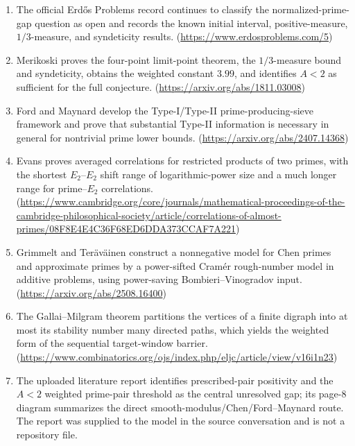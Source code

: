 \begin{enumerate}
\item The official Erdős Problems record continues to classify the normalized-prime-gap question as open and records the known initial interval, positive-measure, \(1/3\)-measure, and syndeticity results. (\url{https://www.erdosproblems.com/5})
\item Merikoski proves the four-point limit-point theorem, the \(1/3\)-measure bound and syndeticity, obtains the weighted constant \(3.99\), and identifies \(A<2\) as sufficient for the full conjecture. (\url{https://arxiv.org/abs/1811.03008})
\item Ford and Maynard develop the Type-I/Type-II prime-producing-sieve framework and prove that substantial Type-II information is necessary in general for nontrivial prime lower bounds. (\url{https://arxiv.org/abs/2407.14368})
\item Evans proves averaged correlations for restricted products of two primes, with the shortest \(E_2\)--\(E_2\) shift range of logarithmic-power size and a much longer range for prime--\(E_2\) correlations. (\url{https://www.cambridge.org/core/journals/mathematical-proceedings-of-the-cambridge-philosophical-society/article/correlations-of-almost-primes/08F8E4E4C36F68ED6DDA373CCAF7A221})
\item Grimmelt and Teräväinen construct a nonnegative model for Chen primes and approximate primes by a power-sifted Cramér rough-number model in additive problems, using power-saving Bombieri--Vinogradov input. (\url{https://arxiv.org/abs/2508.16400})
\item The Gallai--Milgram theorem partitions the vertices of a finite digraph into at most its stability number many directed paths, which yields the weighted form of the sequential target-window barrier. (\url{https://www.combinatorics.org/ojs/index.php/eljc/article/view/v16i1n23})
\item The uploaded literature report identifies prescribed-pair positivity and the \(A<2\) weighted prime-pair threshold as the central unresolved gap; its page-8 diagram summarizes the direct smooth-modulus/Chen/Ford--Maynard route. The report was supplied to the model in the source conversation and is not a repository file.
\end{enumerate}
